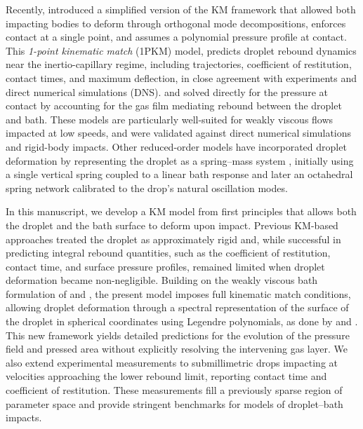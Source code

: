 \documentclass{jfm}
\begin{document}
Recently, \citet{AlventosaEtAl2023} introduced a simplified version of the KM framework that allowed both impacting bodies to deform through orthogonal mode decompositions, enforces contact at a single point, and assumes a polynomial pressure profile at contact. This \textit{1-point kinematic match} (1PKM) model, predicts droplet rebound dynamics near the inertio-capillary regime, including trajectories, coefficient of restitution, contact times, and maximum deflection, in close agreement with experiments and direct numerical simulations (DNS). \citet{phillips2024rebound2D} and \citet{phillips2024lubrication} solved directly for the pressure at contact by accounting for the gas film mediating rebound between the droplet and bath. These models are particularly well-suited for weakly viscous flows impacted at low speeds, and were validated against direct numerical simulations and rigid-body impacts. Other reduced-order models have incorporated droplet deformation by representing the droplet as a spring–mass system \citep{Blanchette2016,Blanchette2017}, initially using a single vertical spring coupled to a linear bath response and later an octahedral spring network calibrated to the drop’s natural oscillation modes. 

In this manuscript, we develop a KM model from first principles that allows both the droplet and the bath surface to deform upon impact. Previous KM-based approaches treated the droplet as approximately rigid \citep{Galeano-RiosEtAl2019} and, while successful in predicting integral rebound quantities, such as the coefficient of restitution, contact time, and surface pressure profiles, remained limited when droplet deformation became non-negligible. Building on the weakly viscous bath formulation of \citet{Galeano-RiosEtAl2021} and \citet{AlventosaEtAl2023}, the present model imposes full kinematic match conditions, allowing droplet deformation through a spectral representation of the surface of the droplet in spherical coordinates using Legendre polynomials, as done by \cite{phillips2024lubrication} and \cite{AlventosaEtAl2023}. This new framework yields detailed predictions for the evolution of the pressure field and pressed area without explicitly resolving the intervening gas layer. We also extend experimental measurements to submillimetric drops impacting at velocities approaching the lower rebound limit, reporting contact time and coefficient of restitution. These measurements fill a previously sparse region of parameter space and provide stringent benchmarks for models of droplet–bath impacts.
\end{document}
